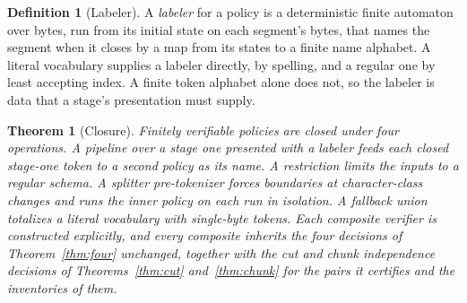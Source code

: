 \documentclass[11pt,a4paper]{article}
\theoremstyle{definition}
\newtheorem{definition}{Definition}
\theoremstyle{plain}
\newtheorem{theorem}{Theorem}
\begin{document}
\begin{definition}[Labeler]\label{def:labeler} A \emph{labeler} for a policy is a deterministic finite automaton over
bytes, run from its initial state on each segment's bytes, that names the segment when it closes by a map from its
states to a finite name alphabet. A literal vocabulary supplies a labeler directly, by spelling, and a regular one by
least accepting index. A finite token alphabet alone does not, so the labeler is data that a stage's presentation must
supply.
\end{definition}

\begin{theorem}[Closure]\label{thm:calculus} Finitely verifiable policies are closed under four operations. A
\emph{pipeline} over a stage one presented with a labeler feeds each closed stage-one token to a second policy as its
name. A \emph{restriction} limits the inputs to a regular schema. A \emph{splitter pre-tokenizer} forces boundaries at
character-class changes and runs the inner policy on each run in isolation. A \emph{fallback union} totalizes a literal
vocabulary with single-byte tokens. Each composite verifier is constructed explicitly, and every composite inherits the
four decisions of Theorem~\ref{thm:four} unchanged, together with the cut and chunk independence decisions of
Theorems~\ref{thm:cut} and~\ref{thm:chunk} for the pairs it certifies and the inventories of them.
\end{theorem}
\end{document}

